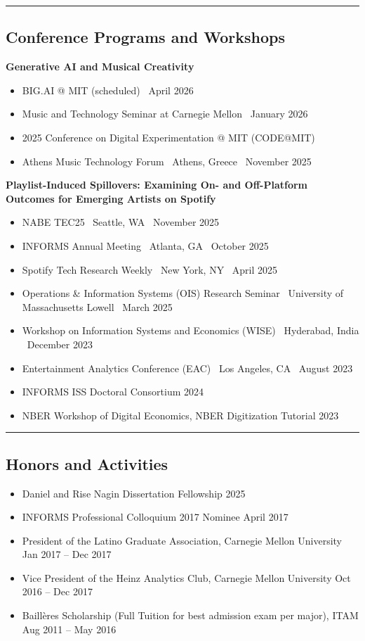 \documentclass[10pt,letterpaper]{article}
\newcommand{\sep}{{\color{gray}\,\textbullet\,\,}}
\newcommand{\hsep}{\noindent\textcolor{gray}{\rule{\textwidth}{0.5pt}}}
\newcommand{\block}[1]{\begin{samepage}\hsep\subsection*{#1}\end{samepage}}
\begin{document}
\block{Conference Programs and Workshops}

\textbf{Generative AI and Musical Creativity}
\begin{itemize}
\item BIG.AI @ MIT (scheduled) \sep April 2026
\item Music and Technology Seminar at Carnegie Mellon \sep January 2026
\item 2025 Conference on Digital Experimentation @ MIT (CODE@MIT)
\item Athens Music Technology Forum \sep Athens, Greece \sep November 2025
\end{itemize}

\textbf{Playlist-Induced Spillovers: Examining On- and Off-Platform Outcomes for Emerging Artists on Spotify}
\begin{itemize}
\item NABE TEC25 \sep Seattle, WA \sep November 2025
\item INFORMS Annual Meeting \sep Atlanta, GA \sep October 2025
\item Spotify Tech Research Weekly \sep New York, NY \sep April 2025
\item Operations \& Information Systems (OIS) Research Seminar \sep University of Massachusetts Lowell \sep March 2025
\item Workshop on Information Systems and Economics (WISE) \sep Hyderabad, India \sep December 2023
\item Entertainment Analytics Conference (EAC) \sep Los Angeles, CA \sep August 2023
\end{itemize}

\begin{itemize}[leftmargin=0pt, label={}]
\item INFORMS ISS Doctoral Consortium \hfill 2024
\item NBER Workshop of Digital Economics, NBER Digitization Tutorial \hfill 2023
\end{itemize}

\block{Honors and Activities}

\begin{itemize}[leftmargin=0pt, label={}]
\item Daniel and Rise Nagin Dissertation Fellowship \hfill 2025
\item INFORMS Professional Colloquium 2017 Nominee \hfill April 2017
\item President of the Latino Graduate Association, Carnegie Mellon University \hfill Jan 2017 -- Dec 2017
\item Vice President of the Heinz Analytics Club, Carnegie Mellon University \hfill Oct 2016 -- Dec 2017
\item Baill\`eres Scholarship (Full Tuition for best admission exam per major), ITAM \hfill Aug 2011 -- May 2016
\end{itemize}
\end{document}
